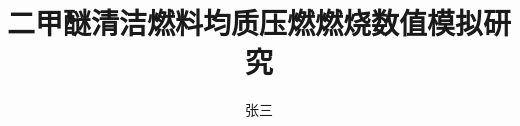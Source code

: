 \documentclass{sdjuthesis}
\title{二甲醚清洁燃料均质压燃燃烧数值模拟研究}
\author{张三}
\begin{document}
\makecover        %

\frontmatter      %
\makedeclaration  %

\sdjutableofcontents

\mainmatter       %




\backmatter
\nocite{*}        %
\sdjubibliography  %

\end{document}
